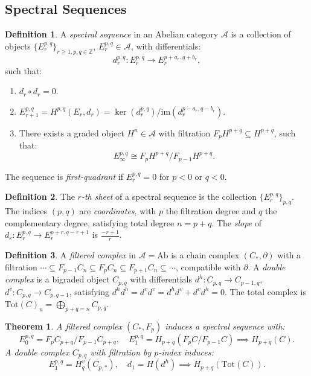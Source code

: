 \documentclass{article}
\theoremstyle{plain}
\newtheorem{theorem}{Theorem}
\theoremstyle{definition}
\newtheorem{definition}{Definition}
\newcommand{\Z}{\mathbb{Z}}
\newcommand{\im}{\text{im}}
\begin{document}
\subsection{Spectral Sequences}

\begin{definition}
A \emph{spectral sequence} in an Abelian category \( \mathcal{A} \) is a collection of objects \( \{ E_r^{p,q} \}_{r \geq 1, p, q \in \Z} \), \( E_r^{p,q} \in \mathcal{A} \), with differentials:
\[
d_r^{p,q}: E_r^{p,q} \to E_r^{p + a_r, q + b_r},
\]
such that:
\begin{enumerate}
    \item \( d_r \circ d_r = 0 \).
    \item \( E_{r+1}^{p,q} = H^{p,q}(E_r, d_r) = \ker(d_r^{p,q}) / \im(d_r^{p - a_r, q - b_r}) \).
    \item There exists a graded object \( H^n \in \mathcal{A} \) with filtration \( F_p H^{p+q} \subseteq H^{p+q} \), such that:
    \[
    E_\infty^{p,q} \cong F_p H^{p+q} / F_{p-1} H^{p+q}.
    \]
\end{enumerate}
The sequence is \emph{first-quadrant} if \( E_r^{p,q} = 0 \) for \( p < 0 \) or \( q < 0 \).
\end{definition}

\begin{definition}
The \emph{\( r \)-th sheet} of a spectral sequence is the collection \( \{ E_r^{p,q} \}_{p,q} \). The indices \( (p, q) \) are \emph{coordinates}, with \( p \) the filtration degree and \( q \) the complementary degree, satisfying total degree \( n = p + q \). The \emph{slope} of \( d_r: E_r^{p,q} \to E_r^{p+r, q-r+1} \) is \( \frac{-r+1}{r} \).
\end{definition}

\begin{definition}
A \emph{filtered complex} in \( \mathcal{A} = \text{Ab} \) is a chain complex \( (C_*, \partial) \) with a filtration \( \cdots \subseteq F_{p-1} C_n \subseteq F_p C_n \subseteq F_{p+1} C_n \subseteq \cdots \), compatible with \( \partial \). A \emph{double complex} is a bigraded object \( C_{p,q} \) with differentials \( d^h: C_{p,q} \to C_{p-1,q} \), \( d^v: C_{p,q} \to C_{p,q-1} \), satisfying \( d^h d^h = d^v d^v = d^h d^v + d^v d^h = 0 \). The total complex is \( \text{Tot}(C)_n = \bigoplus_{p+q=n} C_{p,q} \).
\end{definition}

\begin{theorem}
A filtered complex \( (C_*, F_p) \) induces a spectral sequence with:
\[
E_0^{p,q} = F_p C_{p+q} / F_{p-1} C_{p+q}, \quad E_1^{p,q} = H_{p+q}(F_p C / F_{p-1} C) \implies H_{p+q}(C).
\]
A double complex \( C_{p,q} \) with filtration by \( p \)-index induces:
\[
E_1^{p,q} = H_q^v(C_{p,*}), \quad d_1 = H(d^h) \implies H_{p+q}(\text{Tot}(C)).
\]
\end{theorem}
\end{document}
